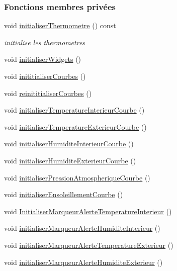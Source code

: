 \subsubsection*{Fonctions membres privées}
\begin{DoxyCompactItemize}
\item 
void \hyperlink{class_ruche_ihm_afb64cca9f0e46c25487ef059a4826d49}{initialiser\+Thermometre} () const
\begin{DoxyCompactList}\small\item\em initialise les thermometres \end{DoxyCompactList}\item 
void \hyperlink{class_ruche_ihm_a98c493fcd2ef145a3d51ff84bbf8748e}{initialiser\+Widgets} ()
\item 
void \hyperlink{class_ruche_ihm_a4fe15b22538611ad9ffc4d807f8b78fd}{inititialiser\+Courbes} ()
\item 
void \hyperlink{class_ruche_ihm_a098911c0edd701f7892e3d140ebffbd9}{reinititialiser\+Courbes} ()
\item 
void \hyperlink{class_ruche_ihm_ad7297b44f6431c0b0c42f1b11d78ace1}{initialiser\+Temperature\+Interieur\+Courbe} ()
\item 
void \hyperlink{class_ruche_ihm_adb1039cc926ceb318c5d851f09d896c1}{initialiser\+Temperature\+Exterieur\+Courbe} ()
\item 
void \hyperlink{class_ruche_ihm_a0ab45ef3e5c512ff1bb4fcfaaa8872bd}{initialiser\+Humidite\+Interieur\+Courbe} ()
\item 
void \hyperlink{class_ruche_ihm_ab4bca9c5285c1e9added34ba374eaf84}{initialiser\+Humidite\+Exterieur\+Courbe} ()
\item 
void \hyperlink{class_ruche_ihm_ab070a28e49cab512d62ca449473706e5}{initialiser\+Pression\+Atmospherique\+Courbe} ()
\item 
void \hyperlink{class_ruche_ihm_a18936cec4b04cee55b582847a5f9c0d7}{initialiser\+Ensoleillement\+Courbe} ()
\item 
void \hyperlink{class_ruche_ihm_a0f44cb030202047fa9a364dfcbf9a13f}{Initialiser\+Marqueur\+Alerte\+Temperature\+Interieur} ()
\item 
void \hyperlink{class_ruche_ihm_a42785d6da8aca09d8becb6d500de8d9f}{initialiser\+Marqueur\+Alerte\+Humidite\+Interieur} ()
\item 
void \hyperlink{class_ruche_ihm_a410bcf0b7ac3ea7134af65d479802c48}{initialiser\+Marqueur\+Alerte\+Temperature\+Exterieur} ()
\item 
void \hyperlink{class_ruche_ihm_ae572f3f2b76e8c9b14a699d3e29422ee}{initialiser\+Marqueur\+Alerte\+Humidite\+Exterieur} ()

\end{DoxyCompactItemize}
